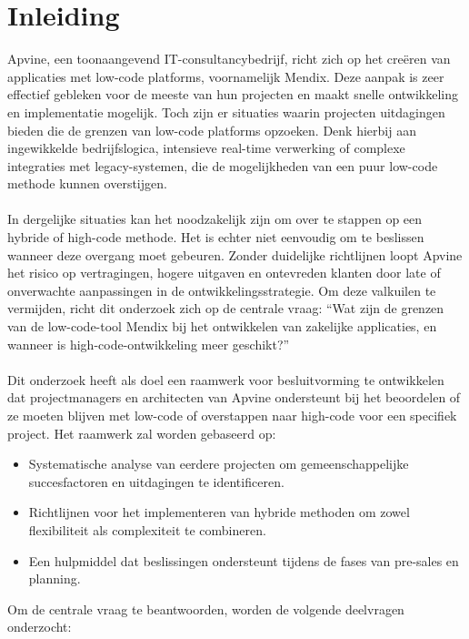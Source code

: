 
\section{Inleiding}%
\label{sec:inleiding}

Apvine, een toonaangevend IT-consultancybedrijf, richt zich op het creëren van applicaties met low-code platforms, voornamelijk Mendix. Deze aanpak is zeer effectief gebleken voor de meeste van hun projecten en maakt snelle ontwikkeling en implementatie mogelijk. Toch zijn er situaties waarin projecten uitdagingen bieden die de grenzen van low-code platforms opzoeken. Denk hierbij aan ingewikkelde bedrijfslogica, intensieve real-time verwerking of complexe integraties met legacy-systemen, die de mogelijkheden van een puur low-code methode kunnen overstijgen.
\\
\\
In dergelijke situaties kan het noodzakelijk zijn om over te stappen op een hybride of high-code methode. Het is echter niet eenvoudig om te beslissen wanneer deze overgang moet gebeuren. Zonder duidelijke richtlijnen loopt Apvine het risico op vertragingen, hogere uitgaven en ontevreden klanten door late of onverwachte aanpassingen in de ontwikkelingsstrategie.
Om deze valkuilen te vermijden, richt dit onderzoek zich op de centrale vraag:
“Wat zijn de grenzen van de low-code-tool Mendix bij het ontwikkelen van zakelijke applicaties, en wanneer is high-code-ontwikkeling meer geschikt?”
\\
\\
Dit onderzoek heeft als doel een raamwerk voor besluitvorming te ontwikkelen dat projectmanagers en architecten van Apvine ondersteunt bij het beoordelen of ze moeten blijven met low-code of overstappen naar high-code voor een specifiek project. Het raamwerk zal worden gebaseerd op:
\begin{itemize}
    \item Systematische analyse van eerdere projecten om gemeenschappelijke succesfactoren en uitdagingen te identificeren.
    \item Richtlijnen voor het implementeren van hybride methoden om zowel flexibiliteit als complexiteit te combineren.
    \item Een hulpmiddel dat beslissingen ondersteunt tijdens de fases van pre-sales en planning.
\end{itemize}
Om de centrale vraag te beantwoorden, worden de volgende deelvragen onderzocht:

